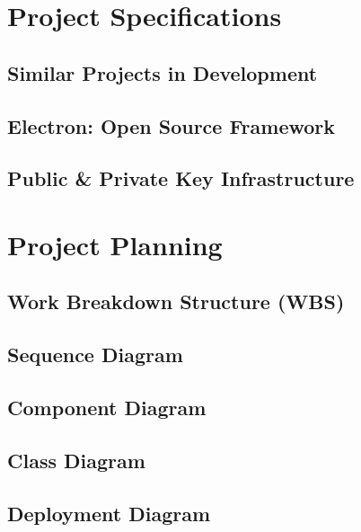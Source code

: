 \documentclass[12pt]{article}
\begin{document}
\section{Project Specifications}
	\subsection{Similar Projects in Development}
		\lipsum[1]
	\subsection{Electron: Open Source Framework}
		\lipsum[1]
	\subsection{Public \& Private Key Infrastructure}
		\lipsum[1]
\pagebreak
\section{Project Planning}
	\lipsum[1]
	\pagebreak
	\subsection{Work Breakdown Structure (WBS)}
	\lipsum[1]
	\pagebreak
	\subsection{Sequence Diagram}
	\lipsum[1]
	\pagebreak
	\subsection{Component Diagram}
	\lipsum[1]
	\pagebreak
	\subsection{Class Diagram}
	\lipsum[1]
	\pagebreak
	\subsection{Deployment Diagram}
	\lipsum[1]
\pagebreak


\end{document}
